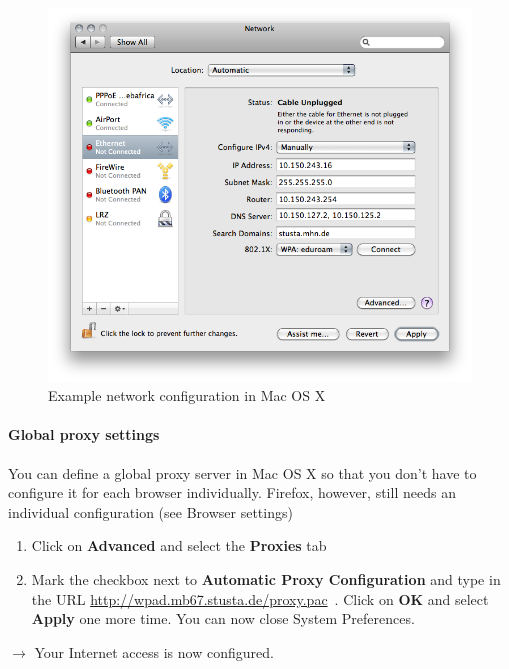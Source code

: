 \documentclass[a4paper,12pt]{scrartcl}
\newcommand{\optemph}[1]{\textbf{#1}}
\begin{document}
\begin{enumerate}
\begin{figure}[h!]
\begin{minipage}[c]{0.38\linewidth}
        \end{minipage}
        \begin{minipage}[c]{0.60\linewidth}
          \centering
          \includegraphics[width=\linewidth,keepaspectratio]{Bilder/IP_Mac_EN}
          \caption{Example network configuration in Mac OS X}
        \end{minipage}
      \end{figure}
\end{enumerate}

\paragraph*{Global proxy settings}
You can define a global proxy server in Mac OS X so that you don't have to configure it for each browser individually. Firefox, however, still needs an individual configuration (see Browser settings)
\begin{enumerate}
	\item Click on \optemph{Advanced} and select the \optemph{Proxies} tab
	\item Mark the checkbox next to \optemph{Automatic Proxy Configuration} and type in the URL \url{http://wpad.mb67.stusta.de/proxy.pac}\ . Click on \optemph{OK} and select \optemph{Apply} one more time. You can now close System Preferences.
\end{enumerate}
$\rightarrow$ Your Internet access is now configured.
\end{document}
